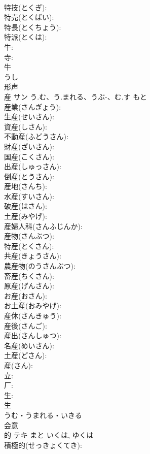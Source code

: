 \documentclass[8pt]{extreport}
\begin{document}
\begin{CJK}{UTF8}{min}
\\	特技(とくぎ): 
\\	特売(とくばい): 
\\	特長(とくちょう): 
\\	特派(とくは): 
\\	牛: 
\\	寺: 
\\	牛	
\\	うし	
\\	形声 
\\	産	サン	う.む、う.まれる、うぶ-、む.す	もと	
\\	産業(さんぎょう): 
\\	生産(せいさん): 
\\	資産(しさん): 
\\	不動産(ふどうさん): 
\\	財産(ざいさん): 
\\	国産(こくさん): 
\\	出産(しゅっさん): 
\\	倒産(とうさん): 
\\	産地(さんち): 
\\	水産(すいさん): 
\\	破産(はさん): 
\\	土産(みやげ): 
\\	産婦人科(さんふじんか): 
\\	産物(さんぶつ): 
\\	特産(とくさん): 
\\	共産(きょうさん): 
\\	農産物(のうさんぶつ): 
\\	畜産(ちくさん): 
\\	原産(げんさん): 
\\	お産(おさん): 
\\	お土産(おみやげ): 
\\	産休(さんきゅう): 
\\	産後(さんご): 
\\	産出(さんしゅつ): 
\\	名産(めいさん): 
\\	土産(どさん): 
\\	産(さん): 
\\	立: 
\\	厂: 
\\	生: 
\\	生	
\\	うむ・うまれる・いきる	
\\	会意 
\\	的	テキ	まと	いくは, ゆくは	
\\	積極的(せっきょくてき): 

\end{CJK}
\end{document}
